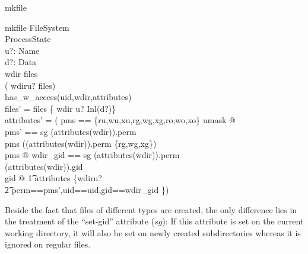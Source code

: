 \begin{doc}{mkfile}
  \begin{schema}{mkfile}
    \Delta FileSystem \\
    \Xi ProcessState \\
    u?: Name \\
    d?: Data \\
    \where
    wdir \isdirin files \\
    \lnot ( wdir\cat\langle u? \rangle \isdirin files)\\
    has\_w\_access(uid,wdir,attributes) \\
  
    files' = files \oplus \{ wdir \cat \langle u? \rangle \mapsto Inl(d?)\}  \\

    attributes' = (\< \LET pms  == \{ru,wu,xu,rg,wg,xg,ro,wo,xo\} \setminus umask @ \\
    \LET pms' == \< \IF sg \in (attributes(wdir)).perm \\
    \THEN pms \cup ((attributes(wdir)).perm \cap \{rg,wg,xg\}) \\
    \ELSE pms @ \>
    \LET wdir\_gid == \< \IF sg \in (attributes(wdir)).perm \\
    \THEN (attributes(wdir)).gid \\
    \ELSE gid @ \>
    \t1 attributes \oplus \{wdir\cat\langle u?\rangle\mapsto \\
    \t2 \lblot perm==pms',uid==uid,gid==wdir\_gid \rblot \})\>
  \end{schema}
\end{doc}
Beside the fact
that files of different types are created, the only difference lies in the
treatment of the ``set-gid'' attribute ($sg$): If this attribute is set on the
current working directory, it will also be set on newly created subdirectories
whereas it is ignored on regular files.  

